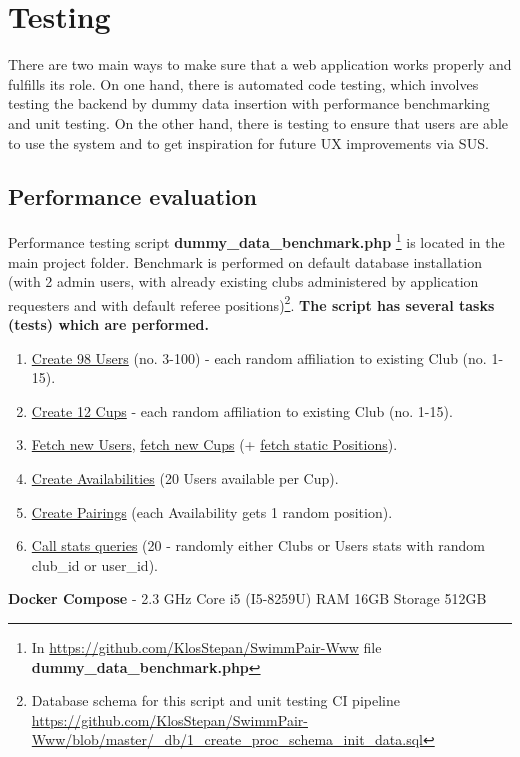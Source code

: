 \chapter{Testing}
There are two main ways to make sure that a web application works properly and fulfills its role. On one hand, there is automated code testing, which involves testing the backend by dummy data insertion with performance benchmarking and unit testing. On the other hand, there is testing to ensure that users are able to use the system and to get inspiration for future UX improvements via SUS.
\section{Performance evaluation}
Performance testing script \textbf{dummy\_data\_benchmark.php} \footnote{In \url{https://github.com/KlosStepan/SwimmPair-Www} file \textbf{dummy\_data\_benchmark.php}} is located in the main project folder. Benchmark is performed on default database installation (with 2 admin users, with already existing clubs administered by application requesters and with default referee positions)\footnote{Database schema for this script and unit testing CI pipeline \url{https://github.com/KlosStepan/SwimmPair-Www/blob/master/_db/1_create_proc_schema_init_data.sql}}.  
\newline
\textbf{The script has several tasks (tests) which are performed.}
\begin{enumerate}
    \item \underline{Create 98 Users} (no. 3-100) - each random affiliation to existing Club (no. 1-15).
    \item \underline{Create 12 Cups} - each random affiliation to existing Club (no. 1-15).
    \item \underline{Fetch new Users}, \underline{fetch new Cups} (+ \underline{fetch static Positions}).
    \item \underline{Create Availabilities} (20 Users available per Cup).
    \item \underline{Create Pairings} (each Availability gets 1 random position).
    \item \underline{Call stats queries} (20 - randomly either Clubs or Users stats with random club\_id or user\_id).
\end{enumerate}
\textbf{Docker Compose} - 2.3 GHz Core i5 (I5-8259U) RAM 16GB Storage 512GB
\newline
